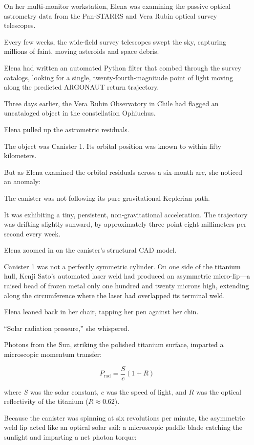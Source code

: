 \documentclass[12pt,twoside,openright]{book}
\begin{document}
On her multi-monitor workstation, Elena was examining the passive
optical astrometry data from the Pan-STARRS and Vera Rubin optical
survey telescopes.

Every few weeks, the wide-field survey telescopes swept the sky,
capturing millions of faint, moving asteroids and space debris.

Elena had written an automated Python filter that combed through the
survey catalogs, looking for a single, twenty-fourth-magnitude point of
light moving along the predicted ARGONAUT return trajectory.

Three days earlier, the Vera Rubin Observatory in Chile had flagged an
uncataloged object in the constellation Ophiuchus.

Elena pulled up the astrometric residuals.

The object was Canister 1. Its orbital position was known to within
fifty kilometers.

But as Elena examined the orbital residuals across a six-month arc, she
noticed an anomaly:

The canister was not following its pure gravitational Keplerian path.

It was exhibiting a tiny, persistent, non-gravitational acceleration.
The trajectory was drifting slightly sunward, by approximately three
point eight millimeters per second every week.

Elena zoomed in on the canister's structural CAD model.

Canister 1 was not a perfectly symmetric cylinder. On one side of the
titanium hull, Kenji Sato's automated laser weld had produced an
asymmetric micro-lip---a raised bead of frozen metal only one hundred
and twenty microns high, extending along the circumference where the
laser had overlapped its terminal weld.

Elena leaned back in her chair, tapping her pen against her chin.

``Solar radiation pressure,'' she whispered.

Photons from the Sun, striking the polished titanium surface, imparted a
microscopic momentum transfer:

\[P_{\text{rad}} = \frac{S}{c} (1 + R)\]

where \(S\) was the solar constant, \(c\) was the speed of light, and
\(R\) was the optical reflectivity of the titanium (\(R \approx 0.62\)).

Because the canister was spinning at six revolutions per minute, the
asymmetric weld lip acted like an optical solar sail: a microscopic
paddle blade catching the sunlight and imparting a net photon torque:
\end{document}
